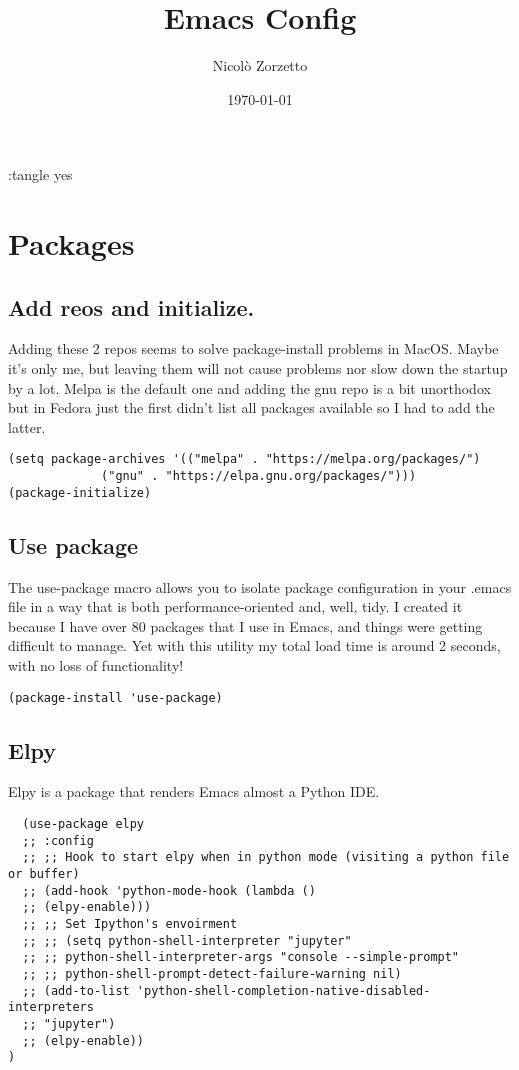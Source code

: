 \documentclass[11pt]{article}
\author{Nicolò Zorzetto}
\date{\today}
\title{Emacs Config}
\begin{document}
\maketitle
\tableofcontents

:tangle yes

\section{Packages}
\label{sec:orgc1ecc4d}
\subsection{Add reos and initialize.}
\label{sec:orgbde2437}
Adding these 2 repos seems to solve package-install problems in MacOS. Maybe it's only me, but leaving them will not cause problems nor slow down the startup by a lot.
Melpa is the default one and adding the gnu repo is a bit unorthodox but in Fedora just the first didn't list all packages available so I had to add the latter.
\begin{verbatim}
(setq package-archives '(("melpa" . "https://melpa.org/packages/")
			 ("gnu" . "https://elpa.gnu.org/packages/")))
(package-initialize)
\end{verbatim}

\subsection{Use package}
\label{sec:orgdcadca0}
The use-package macro allows you to isolate package configuration in your .emacs file in a way that is both performance-oriented and, well, tidy. I created it because I have over 80 packages that I use in Emacs, and things were getting difficult to manage. Yet with this utility my total load time is around 2 seconds, with no loss of functionality!
\begin{verbatim}
(package-install 'use-package)
\end{verbatim}

\subsection{Elpy}
\label{sec:orgdd6872d}
Elpy is a package that renders Emacs almost a Python IDE.
\begin{verbatim}
  (use-package elpy
  ;; :config
  ;; ;; Hook to start elpy when in python mode (visiting a python file or buffer)
  ;; (add-hook 'python-mode-hook (lambda ()
  ;; (elpy-enable)))
  ;; ;; Set Ipython's envoirment
  ;; ;; (setq python-shell-interpreter "jupyter"
  ;; ;; python-shell-interpreter-args "console --simple-prompt"
  ;; ;; python-shell-prompt-detect-failure-warning nil)
  ;; (add-to-list 'python-shell-completion-native-disabled-interpreters
  ;; "jupyter")
  ;; (elpy-enable))
)
\end{verbatim}
\end{document}
